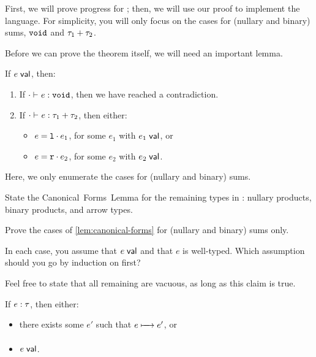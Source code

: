 \documentclass[11pt]{article}
\begin{document}
First, we will prove progress for \LangPSF{}; then, we will use our proof to implement the language.
For simplicity, you will only focus on the cases for (nullary and binary) sums, $\voidtycst$ and $\sumtycst{\tau_1}{\tau_2}$.

Before we can prove the theorem itself, we will need an important lemma.
\begin{lemma}\label{lem:canonical-forms}
  If $\IsVal{e}$, then:
  \begin{enumerate}
    \item If $\cdot \entails \IsOf{e}{\voidtycst}$, then we have reached a contradiction.
    \item If $\cdot \entails \IsOf{e}{\sumtycst{\tau_1}{\tau_2}}$, then either:
      \begin{itemize}
        \item $e = \inlexcst{\tau_2}{e_1}$, for some $e_1$ with $\IsVal{e_1}$, or
        \item $e = \inrexcst{\tau_1}{e_2}$, for some $e_2$ with $\IsVal{e_2}$.
      \end{itemize}
  \end{enumerate}
\end{lemma}
Here, we only enumerate the cases for (nullary and binary) sums.

\begin{task}{10}
  State the Canonical~Forms~Lemma for the remaining types in \LangPSF{}: nullary products, binary products, and arrow types.
\end{task}

\begin{task}{10}
  Prove the cases of \cref{lem:canonical-forms} for (nullary and binary) sums only.
  \begin{hint}
    In each case, you assume that $\IsVal{e}$ and that $e$ is well-typed.
    Which assumption should you go by induction on first?
  \end{hint}
  \begin{hint}
    Feel free to state that all remaining are vacuous, as long as this claim is true.
  \end{hint}
\end{task}


\begin{theorem}[Progress]\label{thm:progress}
  If $\IsOf{e}{\tau}$, then either:
  \begin{itemize}
    \item there exists some $e'$ such that $e \StepsTo e'$, or
    \item $\IsVal{e}$.
  \end{itemize}
\end{theorem}
\end{document}
